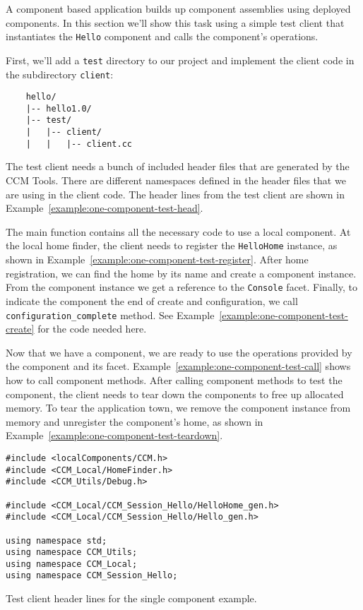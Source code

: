 A component based application builds up component assemblies using deployed
components. In this section we'll show this task using a simple test client that
instantiates the {\tt Hello} component and calls the component's operations.

First, we'll add a {\tt test} directory to our project and implement the client
code in the subdirectory {\tt client}:
\begin{small}
\begin{verbatim}
    hello/
    |-- hello1.0/
    |-- test/
    |   |-- client/
    |   |   |-- client.cc
\end{verbatim}
\end{small}

The test client needs a bunch of included header files that are generated by the
CCM Tools. There are different namespaces defined in the header files that we
are using in the client code. The header lines from the test client are shown in
Example~\ref{example:one-component-test-head}.

The main function contains all the necessary code to use a local component. At
the local home finder, the client needs to register the {\tt HelloHome}
instance, as shown in Example~\ref{example:one-component-test-register}. After
home registration, we can find the home by its name and create a component
instance. From the component instance we get a reference to the {\tt Console}
facet. Finally, to indicate the component the end of create and configuration,
we call {\tt configuration\_complete} method. See
Example~\ref{example:one-component-test-create} for the code needed here.

Now that we have a component, we are ready to use the operations provided by the
component and its facet. Example~\ref{example:one-component-test-call} shows how
to call component methods. After calling component methods to test the
component, the client needs to tear down the components to free up allocated
memory. To tear the application town, we remove the component instance from
memory and unregister the component's home, as shown in
Example~\ref{example:one-component-test-teardown}.

\begin{Example}
\begin{minifbox}
\begin{small}
\begin{verbatim}
#include <localComponents/CCM.h>
#include <CCM_Local/HomeFinder.h>
#include <CCM_Utils/Debug.h>

#include <CCM_Local/CCM_Session_Hello/HelloHome_gen.h>
#include <CCM_Local/CCM_Session_Hello/Hello_gen.h>

using namespace std;
using namespace CCM_Utils;
using namespace CCM_Local;
using namespace CCM_Session_Hello;
\end{verbatim}
\end{small}
\end{minifbox}
\caption{Test client header lines for the single component example.}
\label{example:one-component-test-head}
\end{Example}

